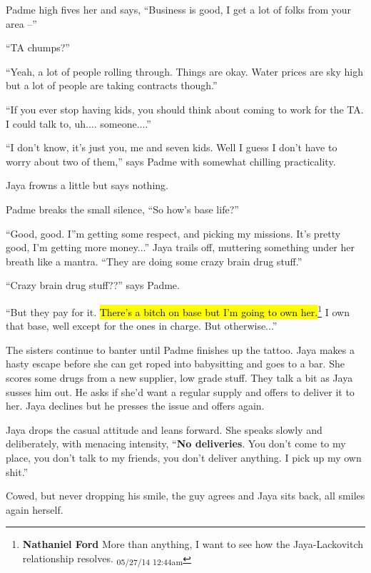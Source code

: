 Padme high fives her and says, ``Business is good, I get a lot of folks from your area --''

``TA chumps?''

``Yeah, a lot of people rolling through.  Things are okay.  Water prices are sky high but a lot of people are taking contracts though.''

``If you ever stop having kids, you should think about coming to work for the TA.  I could talk to, uh.... someone....''

``I don't know, it's just you, me and seven kids.  Well I guess I don't have to worry about two of them,'' says Padme with somewhat chilling practicality.

Jaya frowns a little but says nothing.



Padme breaks the small silence, ``So how's base life?''

``Good, good.  I''m getting some respect, and picking my missions.  It's pretty good, I'm getting more money...'' Jaya trails off, muttering something under her breath like a mantra.  ``They are doing some crazy brain drug stuff.''

``Crazy brain drug stuff??'' says Padme.

``But they pay for it.  \hl{There's a bitch on base but I'm going to own her.}\footnote{\textbf{Nathaniel Ford }More than anything, I want to see how the Jaya-Lackovitch relationship resolves. \textsubscript{05/27/14 12:44am}}  I own that base, well except for the ones in charge.  But otherwise...''



The sisters continue to banter until Padme finishes up the tattoo.  Jaya makes a hasty escape before she can get roped into babysitting and goes to a bar.  She scores some drugs from a new supplier, low grade stuff.  They talk a bit as Jaya susses him out.  He asks if she'd want a regular supply and offers to deliver it to her.  Jaya declines but he presses the issue and offers again.

Jaya drops the casual attitude and leans forward.  She speaks slowly and deliberately, with menacing intensity, ``\textbf{No deliveries}. You don't come to my place, you don't talk to my friends, you don't deliver anything.   I pick up my own shit.''

Cowed, but never dropping his smile, the guy agrees and Jaya sits back, all smiles again herself.



